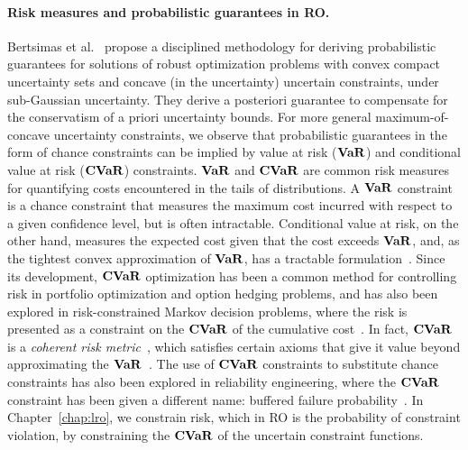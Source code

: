 \paragraph{Risk measures and probabilistic guarantees in \gls{RO}.}
Bertsimas et al.~\cite{bertsimas_probabilistic} propose a disciplined methodology for deriving probabilistic guarantees for solutions of robust optimization problems with convex compact uncertainty sets and concave (in the uncertainty) uncertain constraints, under sub-Gaussian uncertainty. 
They derive a posteriori guarantee to compensate for the conservatism of a priori uncertainty bounds.
For more general maximum-of-concave uncertainty constraints, we observe that probabilistic guarantees in the form of chance constraints can be implied by value at risk ($\mathop{\bf VaR}$) and conditional value at risk ($\mathop{\bf CVaR}$) constraints.  
$\mathop{\bf VaR}$ and $\mathop{\bf CVaR}$ are common risk measures for quantifying costs encountered in the tails of distributions.
A $\mathop{\bf VaR}$ constraint is a chance constraint that measures the maximum cost incurred with respect to a given confidence level, but is often intractable.
Conditional value at risk, on the other hand, measures the expected cost given that the cost exceeds $\mathop{\bf VaR}$, and, as the tightest convex approximation of $\mathop{\bf VaR}$, has a tractable formulation~\citep{cvaropt,cvar}.
Since its development, $\mathop{\bf CVaR}$ optimization has been a common method for controlling risk in portfolio optimization and option hedging problems, and has also been explored in risk-constrained Markov decision problems, where the risk is presented as a constraint on the $\mathop{\bf CVaR}$ of the cumulative cost~\citep{cvar_markov}.
In fact, $\mathop{\bf CVaR}$ is a {\it coherent risk metric}~\citep{coherentrisk}, which satisfies certain axioms that give it value beyond approximating the $\mathop{\bf VaR}$~\citep{cvar_var}.
The use of $\mathop{\bf CVaR}$ constraints to substitute chance constraints has also been explored in reliability engineering, where the $\mathop{\bf CVaR}$ constraint has been given a different name: buffered failure probability~\citep{buffered}.
In Chapter~\ref{chap:lro}, we constrain risk, which in \gls{RO} is the probability of constraint violation, by constraining the $\mathop{\bf CVaR}$ of the uncertain constraint functions.


